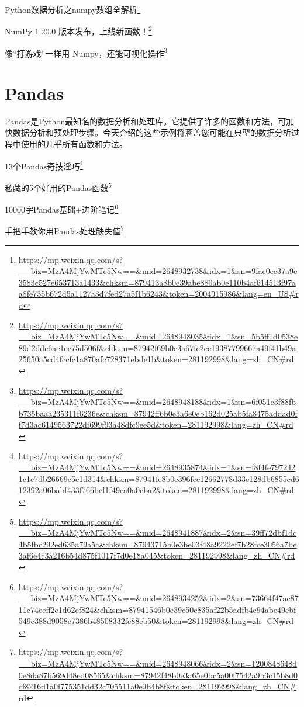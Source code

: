 \documentclass[]{ctexbook}
\renewcommand{\href}[2]{#2\footnote{\url{#1}}}
\begin{document}
\href{https://mp.weixin.qq.com/s?__biz=MzA4MjYwMTc5Nw==\&mid=2648932738\&idx=1\&sn=9fac0ec37a9e3583c527e653713a1433\&chksm=879413a8b0e39abe880ab0e110b4af614513f97aa8fe735b672d5a1127a3d7fed27a5f1b6243\&token=2004915986\&lang=en_US\#rd}{Python数据分析之numpy数组全解析}

\href{https://mp.weixin.qq.com/s?__biz=MzA4MjYwMTc5Nw==\&mid=2648948035\&idx=1\&sn=5b5ff1d0538e89d2ddc6ae1ec75d506f\&chksm=87942f69b0e3a67fc2ee19387799667a49f41b49a25650a5cd4fccfc1a870afc728371ebde1b\&token=281192998\&lang=zh_CN\#rd}{NumPy 1.20.0 版本发布，上线新函数！}

\href{https://mp.weixin.qq.com/s?__biz=MzA4MjYwMTc5Nw==\&mid=2648948188\&idx=1\&sn=6f051c3f88fbb735baaa235311f6236e\&chksm=87942ff6b0e3a6e0eb162d025ab5fa8475addad0ff7d3ac6149563722df699f93a48dfc9ee5d\&token=281192998\&lang=zh_CN\#rd}{像``打游戏''一样用 Numpy，还能可视化操作}

\hypertarget{pandas}{%
\section{Pandas}\label{pandas}}

Pandas是Python最知名的数据分析和处理库。它提供了许多的函数和方法，可加快数据分析和预处理步骤。今天介绍的这些示例将涵盖您可能在典型的数据分析过程中使用的几乎所有函数和方法。

\href{https://mp.weixin.qq.com/s?__biz=MzA4MjYwMTc5Nw==\&mid=2648935874\&idx=1\&sn=f8f4fe7972421c1c7db26669e5c1d314\&chksm=87941fe8b0e396fee12662778d33e128db6855cd612392a06babf433f766bef1f49ea0a0cba2\&token=281192998\&lang=zh_CN\#rd}{13个Pandas奇技淫巧}

\href{https://mp.weixin.qq.com/s?__biz=MzA4MjYwMTc5Nw==\&mid=2648941887\&idx=2\&sn=39ff72dbf1dc4b5fbc292ed635a79a5c\&chksm=87943715b0e3be03f48a9222ef7b28fce3056a7be3af6e4c3a216b54d875f1017f7d0e18a045\&token=281192998\&lang=zh_CN\#rd}{私藏的5个好用的Pandas函数}

\href{https://mp.weixin.qq.com/s?__biz=MzA4MjYwMTc5Nw==\&mid=2648934252\&idx=2\&sn=73664f47ae8711c74eeff2e1d62cf824\&chksm=87941546b0e39c50c835af22b5adfb4c94abe49ebf549e388d9058e7386b48508332fe88eb50\&token=281192998\&lang=zh_CN\#rd}{10000字Pandas基础+进阶笔记}

\href{https://mp.weixin.qq.com/s?__biz=MzA4MjYwMTc5Nw==\&mid=2648948066\&idx=2\&sn=1200848648d0e8da87b569d48ed08565\&chksm=87942f48b0e3a65e0bc5a00f7542a9b3c15b8d0cf8216d1a0f775351dd32c705511a0e9b4b8f\&token=281192998\&lang=zh_CN\#rd}{手把手教你用Pandas处理缺失值}
\end{document}
